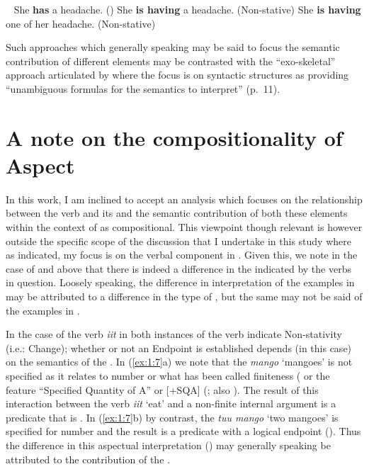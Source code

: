 \ea\label{ex:1:2b}~\citep[adapted from][707]{Lyons1977}
  \ea She \textbf{has} a headache. ()
  \ex She \textbf{is having} a headache. (Non-stative)
  \ex She \textbf{is having} one of her headache. (Non-stative)
\z
\z

Such approaches which generally speaking may be said
to focus the semantic contribution of different elements may be contrasted with
the ``exo-skeletal'' approach articulated by \citet{Borer2005} where the focus
is on syntactic structures as providing  ``unambiguous formulas for the semantics
to interpret'' (p.~11).

\section{A note on the compositionality of Aspect}\label{sec:1.5}

In this work, I am inclined to accept an analysis which focuses on the
relationship between the verb and its  and the semantic
contribution of both these elements within the context of  as
compositional.  This viewpoint though relevant is however outside the specific
scope of the discussion that I undertake in this study where as indicated, my
focus is on the verbal component in .  Given this, we note in the case of
 and  above that there is indeed a difference in the
 indicated by the verbs in question.  Loosely speaking, the difference
in interpretation of the examples in  may be attributed to a
difference in the type of , but the same may not be said of the
examples in .


In the case of the verb \textit{iit} in  both instances of the verb
indicate Non-stativity (i.e.: Change); whether or not an Endpoint is established
depends (in this case) on the semantics of the .  In
(\ref{ex:1:7}a) we note that the  \textit{mango} `mangoes' is
not specified as it relates to number or what has been called finiteness
(\citet{Verkuyl1993} or the feature ``Specified Quantity of A'' or [+SQA]
(\citealt{Verkuyl1993,Verkuyl1999}; also \citealt{Krifka1998}).  The result of this
interaction between the verb \textit{iit} `eat' and a non-finite internal
argument is a predicate that is .  In (\ref{ex:1:7}b) by contrast, the
 \textit{tuu mango} `two mangoes' is specified for number and
the result is a predicate with a logical endpoint ().  Thus the difference
in this aspectual interpretation () may generally speaking be attributed
to the contribution of the .

